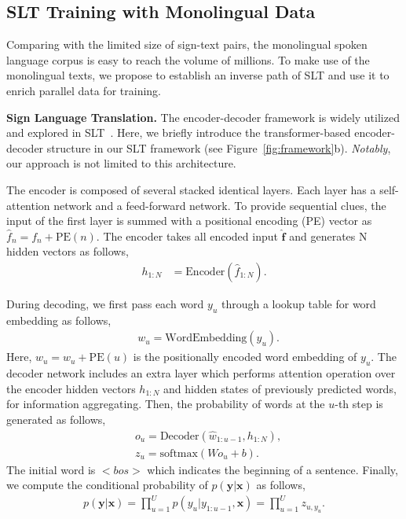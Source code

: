 \documentclass[final]{cvpr}
\begin{document}
\subsection{SLT Training with Monolingual Data} \label{subsec:signbt}

Comparing with the limited size of sign-text pairs, the monolingual spoken language corpus is easy to reach the volume of millions. 
To make use of the monolingual texts, we propose to establish an inverse path of SLT and use it to enrich parallel data for training.  


\textbf{Sign Language Translation.}
The encoder-decoder framework is widely utilized and explored in SLT~\cite{slt-nslt-cihan18,slt-trans-cihan20}. 
Here, we briefly introduce the transformer-based encoder-decoder structure in our SLT framework (see Figure~\ref{fig:framework}b). 
\textit{Notably}, our approach is not limited to this architecture. 

The encoder is composed of several stacked identical layers. 
Each layer has a self-attention network and a feed-forward network. 
To provide sequential clues, the input of the first layer is summed with a positional encoding (PE) vector as $\hat{f}_n = f_n + \text{PE}(n)$. 
The encoder takes all encoded input $\hat{\mathbf{f}}$ and generates N hidden vectors as follows, 
\begin{align}
   h_{1:N} &= \text{Encoder}(\hat{f}_{1:N}).
\end{align}

During decoding, we first pass each word $y_u$ through a lookup table for word embedding as follows, 
\begin{align}
   &w_u = \text{WordEmbedding}(y_u).  
\end{align}
Here, $\hat{w}_{u} = w_{u} + \text{PE}(u)$ is the positionally encoded word embedding of $y_u$. 
The decoder network includes an extra layer which performs attention operation over the encoder hidden vectors $h_{1:N}$ and hidden states of previously predicted words, for information aggregating. 
Then, the probability of words at the $u$-th step is generated as follows, 
\begin{align}
   &o_u = \text{Decoder}(\hat{w}_{1:u-1}, h_{1:N}), \label{eq:wordbyword}  \\ 
   &z_u = \text{softmax}(W o_u +b).
\end{align}
The initial word is $<\!bos\!>$ which indicates the beginning of a sentence. 
Finally, we compute the conditional probability of $p(\mathbf{y}|\mathbf{x})$ as follows, 
\begin{align} \label{eq:decode}
   p(\mathbf{y}|\mathbf{x}) = \prod_{u=1}^{U} p(y_u|y_{1:u-1}, \mathbf{x}) = \prod_{u=1}^{U} z_{u, y_u}.
\end{align}
\end{document}
